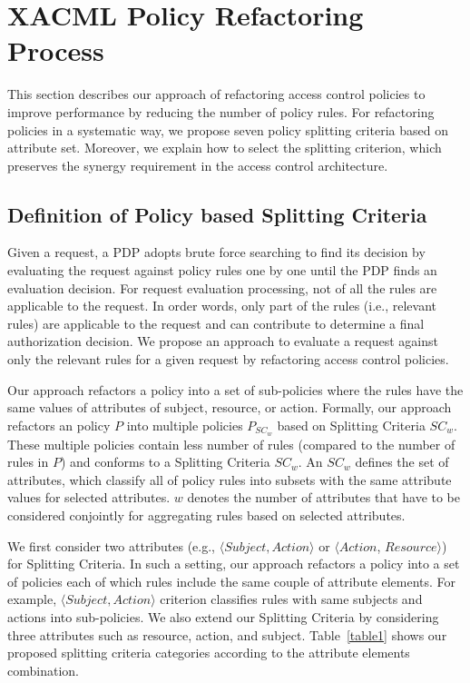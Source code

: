 \section{XACML Policy Refactoring Process} \label{sec:approach}
This section describes our approach of refactoring access control policies to improve performance by reducing the number of policy rules. 
For refactoring policies in a systematic way, we propose seven policy splitting criteria
based on attribute set. Moreover, we explain how to select the splitting criterion, which preserves the synergy requirement in the access control architecture. 

 


\subsection{Definition of Policy based Splitting Criteria} \label{subsec:SplittingCriteria}


Given a request, a PDP adopts brute force searching to find its decision
by evaluating the request against policy rules one by one until the PDP finds an evaluation decision.
For request evaluation processing, not of all the rules are applicable to the request.
In order words, only part of the rules (i.e., relevant rules) are applicable to the request and can contribute
to determine a final authorization decision.
We propose an approach to evaluate a request against only the relevant rules for a given request by refactoring
access control policies.
  
Our approach refactors a policy into a set of sub-policies where the rules have the same values of attributes of subject, resource, or 
action.
Formally, our approach refactors an policy \normalsize $P$ into 
multiple policies \normalsize $P_{SC_{w}}$ based on Splitting Criteria $SC_{w}$.
These multiple policies contain less number of rules (compared to the number of rules in \normalsize $P$) and conforms to a Splitting Criteria $SC_{w}$. An $SC_{w}$ defines the set of attributes, which classify all of policy rules into subsets with the same attribute values for
selected attributes.
$w$ denotes the number of attributes that have to be considered conjointly for aggregating 
rules based on selected attributes. 


 
We first consider two attributes (e.g., $\langle Subject, Action\rangle$ or $\langle Action$, $Resource\rangle$) for Splitting Criteria. In such a setting, our approach refactors a policy into a set of 
policies each of which rules include the same couple of attribute elements. For example, $\langle Subject, Action\rangle$ criterion
classifies rules with same subjects and actions into sub-policies.
We also extend our Splitting Criteria by considering three attributes such as resource, action, and subject.
Table~\ref{table1} shows our proposed splitting criteria categories according to the attribute elements combination.

